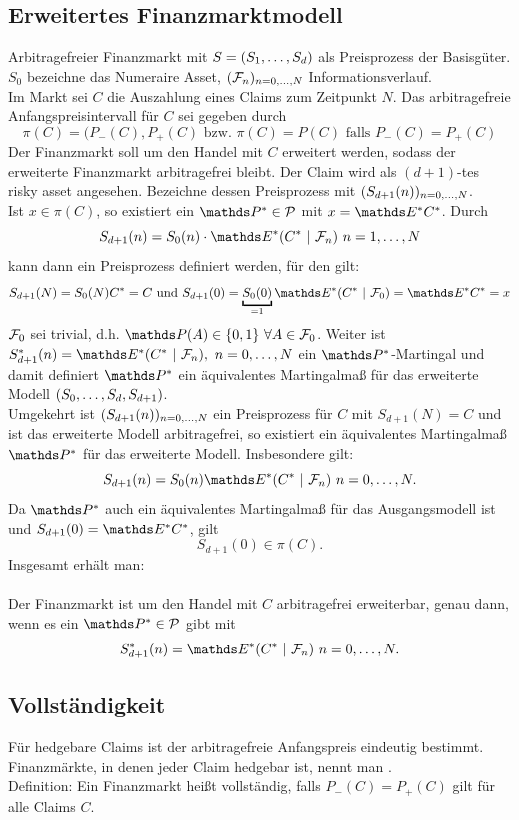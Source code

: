 \subsection{Erweitertes Finanzmarktmodell}
\label{sub:erw_finanzmarktmodell}
Arbitragefreier Finanzmarkt mit $S=(S_1, \dots ,S_d)$ als Preisprozess der Basisgüter.
$S_0$ bezeichne das Numeraire Asset, $(\mathcal{F}_n)_{n=0,\dots,N}$ Informationsverlauf.\\
Im Markt sei $C$ die Auszahlung eines Claims zum Zeitpunkt $N$.
Das arbitragefreie Anfangspreisintervall für $C$ sei gegeben durch
\[
\pi(C)=(P_-(C),P_+(C)\text{ bzw. } \pi(C)=P(C) \text{ falls }P_-(C)=P_+(C)
\]
Der Finanzmarkt soll um den Handel mit $C$ erweitert werden, sodass der erweiterte Finanzmarkt arbitragefrei bleibt.
Der Claim wird als $(d+1)$-tes risky asset angesehen.
Bezeichne dessen Preisprozess mit $(S_{d+1}(n))_{n=0, \dots ,N}$.\\
Ist $x\in \pi(C)$, so existiert ein $\Pw^*\in\mc{P}$ mit $x=\E^*C^*$.
Durch
\[
S_{d+1}(n)=S_0(n)\cdot \E^*(C^*~|~\F_n)~n=1\dt{,}N
\]
kann dann ein Preisprozess definiert werden, für den gilt:
\[
S_{d+1}(N)=S_0(N)C^*=C \text{ und }S_{d+1}(0)=\underbracket{S_0(0)}_{=1}\E^*(C^*~|~\F_0)=\E^*C^*=x
\]
$\mathcal{F}_0$ sei trivial, d.h. $\Pw(A)\in \{0,1\}~\forall A\in \F_0$.
Weiter ist $S_{d+1}^*(n)=\E^*(C^*~|~\F_n),~n=0\dt{,}N$ ein $\Pw^*$-Martingal und damit definiert $\Pw^*$ ein äquivalentes Martingalmaß für das erweiterte Modell $(S_0, \dots ,S_d,S_{d+1})$.\\
Umgekehrt ist $(S_{d+1}(n))_{n=0, \dots ,N}$ ein Preisprozess für $C$ mit $S_{d+1}(N)=C$ und ist das erweiterte Modell arbitragefrei, so existiert ein äquivalentes Martingalmaß $\Pw^*$ für das erweiterte Modell.
Insbesondere gilt:
\[
S_{d+1}(n)=S_0(n)\E^*(C^*~|~\F_n)~n=0\dt{,}N.
\]
Da $\Pw^*$ auch ein äquivalentes Martingalmaß für das Ausgangsmodell ist und $S_{d+1}(0)=\E^*C^*$, gilt
\[
S_{d+1}(0)\in \pi(C).
\]
Insgesamt erhält man:\\
\\
Der Finanzmarkt ist um den Handel mit $C$ arbitragefrei erweiterbar, genau dann, wenn es ein $\Pw^*\in \mc{P}$ gibt mit
\[
S_{d+1}^*(n)=\E^*(C^*~|~\F_n)~n=0\dt{,}N.
\]

\subsection{Vollständigkeit}
\label{sub:vollstaendigkeit}
Für hedgebare Claims ist der arbitragefreie Anfangspreis eindeutig bestimmt.
Finanzmärkte, in denen jeder Claim hedgebar ist, nennt man .\\
Definition: Ein Finanzmarkt heißt vollständig, falls $P_-(C)=P_+(C)$ gilt für alle Claims $C$.

